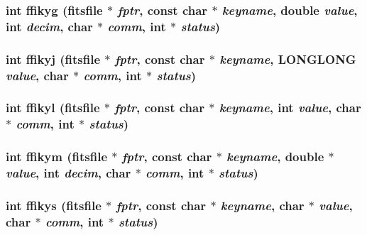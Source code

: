 \subsubsection{\setlength{\rightskip}{0pt plus 5cm}int ffikyg (\bf{fitsfile} $\ast$ {\em fptr}, const char $\ast$ {\em keyname}, double {\em value}, int {\em decim}, char $\ast$ {\em comm}, int $\ast$ {\em status})}\label{fitsio__64_8h_24996516801432718d31f7426d064006}


\subsubsection{\setlength{\rightskip}{0pt plus 5cm}int ffikyj (\bf{fitsfile} $\ast$ {\em fptr}, const char $\ast$ {\em keyname}, \bf{LONGLONG} {\em value}, char $\ast$ {\em comm}, int $\ast$ {\em status})}\label{fitsio__64_8h_13613553fb1fc6a12fd7cd38c8d434bb}


\subsubsection{\setlength{\rightskip}{0pt plus 5cm}int ffikyl (\bf{fitsfile} $\ast$ {\em fptr}, const char $\ast$ {\em keyname}, int {\em value}, char $\ast$ {\em comm}, int $\ast$ {\em status})}\label{fitsio__64_8h_a4ca40c0298931f7db20e3bc061dad32}


\subsubsection{\setlength{\rightskip}{0pt plus 5cm}int ffikym (\bf{fitsfile} $\ast$ {\em fptr}, const char $\ast$ {\em keyname}, double $\ast$ {\em value}, int {\em decim}, char $\ast$ {\em comm}, int $\ast$ {\em status})}\label{fitsio__64_8h_304bdae48864568598985614f7d2fdac}


\subsubsection{\setlength{\rightskip}{0pt plus 5cm}int ffikys (\bf{fitsfile} $\ast$ {\em fptr}, const char $\ast$ {\em keyname}, char $\ast$ {\em value}, char $\ast$ {\em comm}, int $\ast$ {\em status})}\label{fitsio__64_8h_05970f0b7eb3d0035419ea3aaddb3517}


